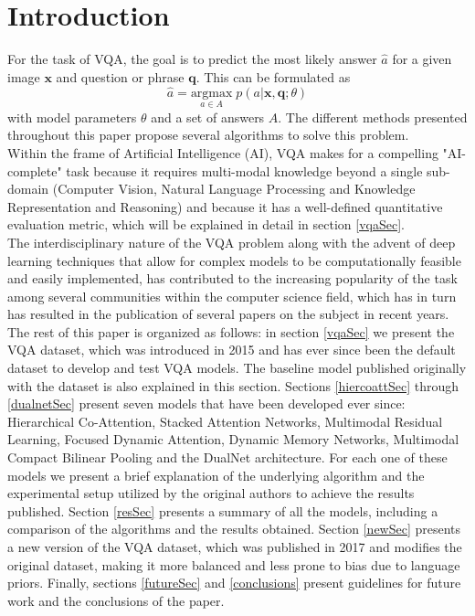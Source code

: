 \documentclass{article}
\begin{document}
\section{Introduction}\label{intro}
For the task of VQA, the goal is to predict the most likely answer $\hat{a}$ for a given image $\bm{x}$ and question or phrase $\bm{q}$. This can be formulated as 
\begin{equation*}
    \hat{a} = \underset{a \in A}{\text{argmax}}\;p(a|\bm{x},\bm{q};\theta)
\end{equation*}
with model parameters $\theta$ and a set of answers $A$. The different methods presented throughout this paper propose several algorithms to solve this problem.\\
Within the frame of Artificial Intelligence (AI), VQA makes for a compelling "AI-complete" task because it requires multi-modal knowledge beyond a single sub-domain (Computer Vision, Natural Language Processing and Knowledge Representation and Reasoning) and because it has a well-defined quantitative evaluation metric, which will be explained in detail in section \ref{vqaSec}.\\
The interdisciplinary nature of the VQA problem along with the advent of deep learning techniques that allow for complex models to be computationally feasible and easily implemented, has contributed to the increasing popularity of the task among several communities within the computer science field, which has in turn has resulted in the publication of several papers on the subject in recent years.\\
The rest of this paper is organized as follows: in section \ref{vqaSec} we present the VQA dataset, which was introduced in 2015 and has ever since been the default dataset to develop and test VQA models. The baseline model published originally with the dataset is also explained in this section. Sections \ref{hiercoattSec} through \ref{dualnetSec} present seven models that have been developed ever since: Hierarchical Co-Attention, Stacked Attention Networks, Multimodal Residual Learning, Focused Dynamic Attention, Dynamic Memory Networks, Multimodal Compact Bilinear Pooling and the DualNet architecture. For each one of these models we present a brief explanation of the underlying algorithm and the experimental setup utilized by the original authors to achieve the results published. Section \ref{resSec} presents a summary of all the models, including a comparison of the algorithms and the results obtained. Section \ref{newSec} presents a new version of the VQA dataset, which was published in 2017 and modifies the original dataset, making it more balanced and less prone to bias due to language priors. Finally, sections \ref{futureSec} and \ref{conclusions} present guidelines for future work and the conclusions of the paper.
\end{document}
